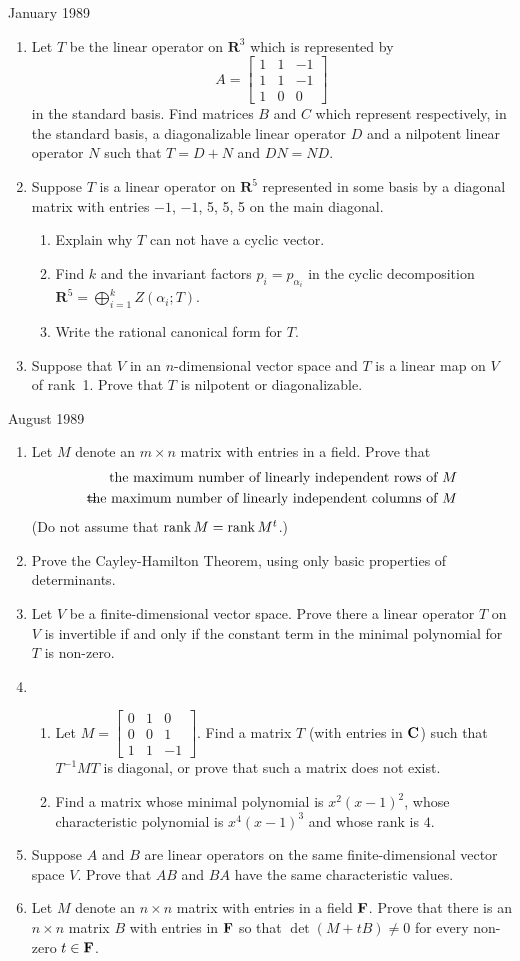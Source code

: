 \documentclass[11pt]{amsart}
\renewcommand{\(}{\left(}
\renewcommand{\)}{\right)}
\renewcommand{\[}{\left[}
\renewcommand{\]}{\right]}
\newcommand{\cn}{\mbox{\bf C}}
\newcommand{\m}{\hskip-8.5pt&{}&\hskip-8.5pt}
\newcommand{\R}{{\mathbf R}}
\newcommand{\heading}[1]{\centerline{\large\sc #1}}
\newcommand{\num}{\begin{enumerate}}
\newcommand{\enum}{\end{enumerate}}
\newcommand{\fe}{{\bf F}}
\begin{document}
\heading{January 1989}
\num \item
Let $T$ be the linear operator on $\R^3$ which is represented by
$$
A=\[\begin{array}{ccc}1&1&-1\\1&1&-1\\1&0&0\end{array}\]
$$
in the standard basis.  Find matrices $B$ and $C$ which represent
respectively, in the standard basis, a diagonalizable linear operator $D$
and a nilpotent linear operator $N$ such that $T=D+N$ and $DN=ND$.
\item Suppose $T$ is a linear operator on $\R^5$ represented in some
basis by a diagonal matrix with entries $-1$, $-1$, 5, 5, 5 on the
main diagonal.
\num
\item Explain why $T$ can not have a cyclic vector.
\item Find $k$ and the invariant factors $p_i=p_{\alpha_i}$ in the
cyclic decomposition $\R^5=\bigoplus_{i=1}^k Z(\alpha_i;T)$.
\item Write the rational canonical form for $T$.
\enum
\item Suppose that $V$ in an $n$-dimensional vector space and $T$ is a
linear map on $V$ of rank~1.  Prove that $T$ is nilpotent or
diagonalizable. 
\enum

\heading{August 1989}

\num
\item Let $M$ denote an $m\times n$ matrix with entries in a field.
Prove that
\begin{eqnarray*}
\m\mbox{the maximum number of linearly independent rows of $M$}\\
=\m\mbox{the maximum number of linearly independent columns of $M$}
\end{eqnarray*}
(Do not assume that $\mathop{\rm rank} M=\mathop{\rm rank}M^t$.)
\item Prove the Cayley-Hamilton Theorem, using only basic properties
of determinants.
\item Let $V$ be a finite-dimensional vector space.  Prove there a linear
operator $T$ on $V$ is invertible if and only if the constant term in
the minimal polynomial for $T$ is non-zero.
\item\num\item Let
$M=\[\begin{array}{ccc}0&1&0\\0&0&1\\1&1&-1\end{array}\]$. Find a
matrix $T$ (with entries in $\cn$) such that $T^{-1}MT$ is diagonal, or
prove that such a matrix does not exist.
\item Find a matrix whose minimal polynomial is $x^2(x-1)^2$, whose
characteristic polynomial is $x^4(x-1)^3$ and whose rank is $4$.
\enum
\item Suppose $A$ and $B$ are linear operators on the same
finite-dimensional vector space $V$.  Prove that $AB$ and $BA$ have
the same characteristic values.
\item Let $M$ denote an $n\times n$ matrix with entries in a field
$\fe$.  Prove that there is an $n\times n$ matrix $B$ with entries in
$\fe$ so that $\det(M+tB)\ne 0$ for every non-zero $t\in\fe$.
\enum
\end{document}
